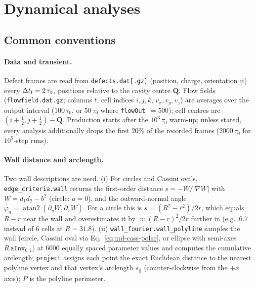 \section{Dynamical analyses}
\label{sec:md-dyn}

\subsection{Common conventions}
\label{sec:md-conv}

\paragraph{Data and transient.} Defect frames are read from \texttt{defects.dat[.gz]} (position, charge, orientation $\psi$)
every $\Delta t_{\rm f}=2\,\tau_0$, positions relative to the cavity centre $\mathbf Q$. Flow fields (\texttt{flowfield.dat.gz};
columns $t$, cell indices $i,j,k$, $v_x,v_y,v_z$) are averages over the output interval ($100\,\tau_0$, or $50\,\tau_0$ where
\texttt{flowOut}~$=500$); cell centres are $(i+\tfrac12,j+\tfrac12)-\mathbf Q$. Production starts after the
$10^3\,\tau_0$ warm-up; unless stated, every analysis additionally drops the first $20\%$ of the recorded frames
($2000\,\tau_0$ for $10^5$-step runs).

\paragraph{Wall distance and arclength.} Two wall descriptions are used.
(i) For circles and Cassini ovals, \texttt{edge\_criteria.wall} returns the first-order distance $s=-W/|\nabla W|$ with
$W=d_1d_2-b^2$ (circle: $a=0$), and the outward-normal angle $\varphi_n=\operatorname{atan2}(\partial_yW,\partial_xW)$.
For a circle this is $s=(R^2-r^2)/2r$, which equals $R-r$ near the wall and overestimates it by $\approx(R-r)^2/2r$ further in
(e.g.\ $6.7$ instead of $6$ cells at $R=31.8$).
(ii) \texttt{wall\_fourier.wall\_polyline} samples the wall (circle, Cassini oval via Eq.~\eqref{eq:md-cass-polar}, or ellipse with
semi-axes $R\,\texttt{aInv}_{0,1}$) at $6000$ equally spaced parameter values and computes the cumulative arclength;
\texttt{project} assigns each point the exact Euclidean distance to the nearest polyline vertex and that vertex's arclength $s_\parallel$
(counter-clockwise from the $+x$ axis); $P$ is the polyline perimeter.

